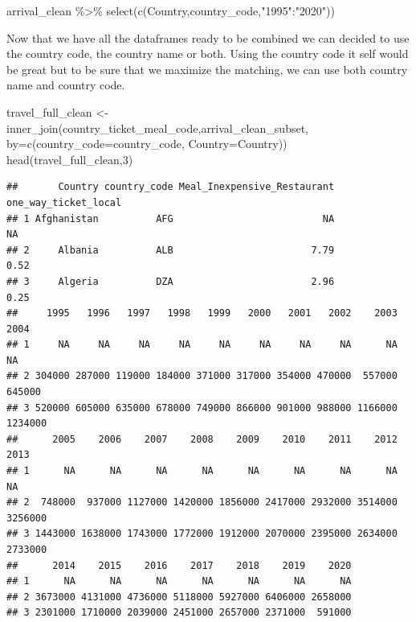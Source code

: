 \documentclass[
]{book}
\newenvironment{Shaded}{\begin{snugshade}}{\end{snugshade}}
\newcommand{\AttributeTok}[1]{\textcolor[rgb]{0.77,0.63,0.00}{#1}}
\newcommand{\DecValTok}[1]{\textcolor[rgb]{0.00,0.00,0.81}{#1}}
\newcommand{\FunctionTok}[1]{\textcolor[rgb]{0.00,0.00,0.00}{#1}}
\newcommand{\NormalTok}[1]{#1}
\newcommand{\OtherTok}[1]{\textcolor[rgb]{0.56,0.35,0.01}{#1}}
\newcommand{\SpecialCharTok}[1]{\textcolor[rgb]{0.00,0.00,0.00}{#1}}
\newcommand{\StringTok}[1]{\textcolor[rgb]{0.31,0.60,0.02}{#1}}
\begin{document}
\begin{Shaded}
\begin{Highlighting}[]
\NormalTok{arrival\_clean }\SpecialCharTok{\%\textgreater{}\%}
   \FunctionTok{select}\NormalTok{(}\FunctionTok{c}\NormalTok{(Country,country\_code,}\StringTok{"1995"}\SpecialCharTok{:}\StringTok{"2020"}\NormalTok{))}
\end{Highlighting}
\end{Shaded}

Now that we have all the dataframes ready to be combined we can decided to use the country code, the country name or both. Using the country code it self would be great but to be sure that we maximize the matching, we can use both country name and country code.

\begin{Shaded}
\begin{Highlighting}[]
\NormalTok{travel\_full\_clean }\OtherTok{\textless{}{-}} \FunctionTok{inner\_join}\NormalTok{(country\_ticket\_meal\_code,arrival\_clean\_subset, }\AttributeTok{by=}\FunctionTok{c}\NormalTok{(}\StringTok{\textquotesingle{}country\_code\textquotesingle{}}\OtherTok{=}\StringTok{\textquotesingle{}country\_code\textquotesingle{}}\NormalTok{, }\StringTok{\textquotesingle{}Country\textquotesingle{}}\OtherTok{=}\StringTok{\textquotesingle{}Country\textquotesingle{}}\NormalTok{))}
\FunctionTok{head}\NormalTok{(travel\_full\_clean,}\DecValTok{3}\NormalTok{)}
\end{Highlighting}
\end{Shaded}

\begin{verbatim}
##       Country country_code Meal_Inexpensive_Restaurant one_way_ticket_local
## 1 Afghanistan          AFG                          NA                   NA
## 2     Albania          ALB                        7.79                 0.52
## 3     Algeria          DZA                        2.96                 0.25
##     1995   1996   1997   1998   1999   2000   2001   2002    2003    2004
## 1     NA     NA     NA     NA     NA     NA     NA     NA      NA      NA
## 2 304000 287000 119000 184000 371000 317000 354000 470000  557000  645000
## 3 520000 605000 635000 678000 749000 866000 901000 988000 1166000 1234000
##      2005    2006    2007    2008    2009    2010    2011    2012    2013
## 1      NA      NA      NA      NA      NA      NA      NA      NA      NA
## 2  748000  937000 1127000 1420000 1856000 2417000 2932000 3514000 3256000
## 3 1443000 1638000 1743000 1772000 1912000 2070000 2395000 2634000 2733000
##      2014    2015    2016    2017    2018    2019    2020
## 1      NA      NA      NA      NA      NA      NA      NA
## 2 3673000 4131000 4736000 5118000 5927000 6406000 2658000
## 3 2301000 1710000 2039000 2451000 2657000 2371000  591000
\end{verbatim}
\end{document}
